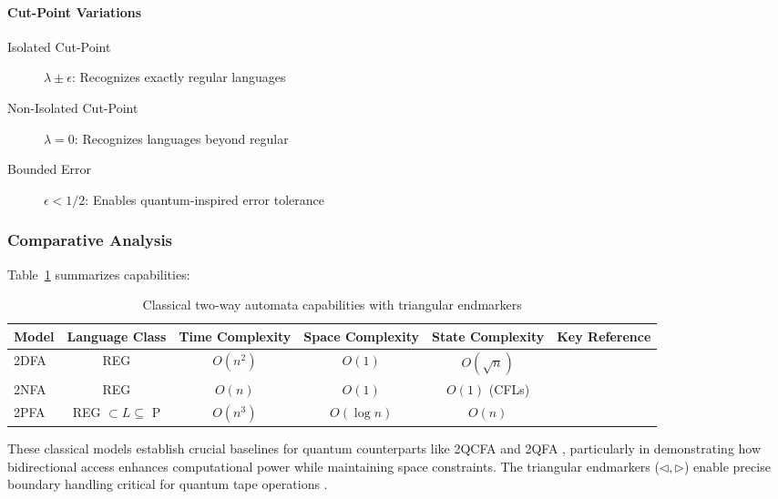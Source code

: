 \paragraph{Cut-Point Variations}
\begin{description}
    \item[Isolated Cut-Point] \( \lambda \pm \epsilon \): Recognizes exactly regular languages \cite{rabin1963probabilistic}
    \item[Non-Isolated Cut-Point] \( \lambda = 0 \): Recognizes languages beyond regular \cite{paz1971introduction}
    \item[Bounded Error] \( \epsilon < 1/2 \): Enables quantum-inspired error tolerance \cite{nielsen2010quantum}
\end{description}

\subsubsection{Comparative Analysis}
Table~\ref{tab:two-way-comparison} summarizes capabilities:
\begin{table}[h]
    \centering
    \begin{tabular}{|l|c|c|c|c|c|}
        \hline
        Model & Language Class & Time Complexity & Space Complexity & State Complexity & Key Reference \\
        \hline
        2DFA & REG & \( O(n^2) \) & \( O(1) \) & \( O(\sqrt{n}) \) & \cite{hopcroft2006introduction} \\
        2NFA & REG & \( O(n) \) & \( O(1) \) & \( O(1) \) (CFLs) & \cite{yakaryilmaz2010succinctness} \\
        2PFA & REG \( \subset L \subseteq \) P & \( O(n^3) \) & \( O(\log n) \) & \( O(n) \) & \cite{freivalds1981probabilistic} \\
        \hline
    \end{tabular}
    \caption{Classical two-way automata capabilities with triangular endmarkers}
    \label{tab:two-way-comparison}
\end{table}

These classical models establish crucial baselines for quantum counterparts like 2QCFA and 2QFA \cite{ambainis2002quantum}, particularly in demonstrating how bidirectional access enhances computational power while maintaining space constraints. The triangular endmarkers (\(\triangleleft, \triangleright\)) enable precise boundary handling critical for quantum tape operations \cite{kondacs1997power}.
